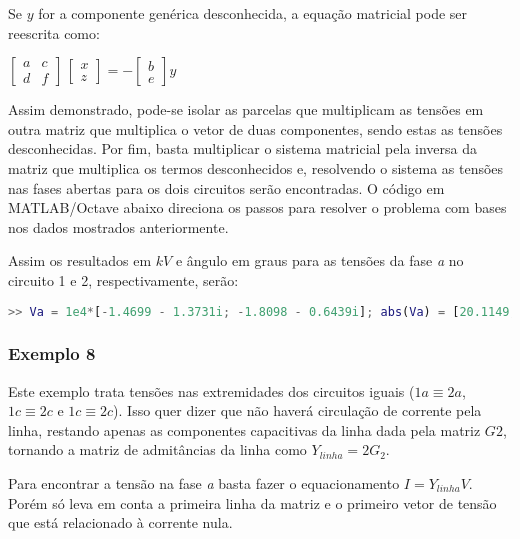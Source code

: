 Se $y$ for a componente genérica desconhecida, a equação matricial pode ser reescrita como:

\begin{center}
    $\begin{bmatrix} a  & c \\ d & f \end{bmatrix} \, \begin{bmatrix} x \\ z \end{bmatrix} = -\begin{bmatrix} b  \\ e \end{bmatrix}y$
\end{center}

Assim demonstrado, pode-se isolar as parcelas que multiplicam as tensões em outra matriz que multiplica o vetor de duas componentes, sendo estas as tensões desconhecidas. Por fim, basta multiplicar o sistema matricial pela inversa da matriz que multiplica os termos desconhecidos e, resolvendo o sistema as tensões nas fases abertas para os dois circuitos serão encontradas. O código em MATLAB/Octave abaixo direciona os passos para resolver o problema com bases nos dados mostrados anteriormente.



Assim os resultados em $kV$ e ângulo em graus para as tensões da fase \textit{a} no circuito 1 e 2, respectivamente, serão:

\begin{lstlisting}[language=Matlab,style=consolestyle]
>> Va = 1e4*[-1.4699 - 1.3731i; -1.8098 - 0.6439i]; abs(Va) = [20.1149; 19.2096]; angle(Va)*180/pi = [-136.9514; -160.4149];
\end{lstlisting}

\subsubsection*{Exemplo 8}

Este exemplo trata tensões nas extremidades dos circuitos iguais ($1a \equiv 2a$, $1c \equiv 2c$ e $1c \equiv 2c$). Isso quer dizer que não haverá circulação de corrente pela linha, restando apenas as componentes capacitivas da linha dada pela matriz $G2$, tornando a matriz de admitâncias da linha como $Y_{linha} = 2G_2$. 

Para encontrar a tensão na fase \textit{a} basta fazer o equacionamento $I = Y_{linha} V$. Porém só leva em conta a primeira linha da matriz e o primeiro vetor de tensão que está relacionado à corrente nula. 

